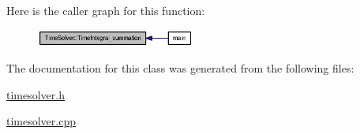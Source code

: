 Here is the caller graph for this function:\nopagebreak
\begin{figure}[H]
\begin{center}
\leavevmode
\includegraphics[width=147pt]{classTimeSolver_2cbbdd8eecbd3aae12c153f8b9da1402_icgraph}
\end{center}
\end{figure}


The documentation for this class was generated from the following files:\begin{CompactItemize}
\item 
\hyperlink{timesolver_8h}{timesolver.h}\item 
\hyperlink{timesolver_8cpp}{timesolver.cpp}\end{CompactItemize}
